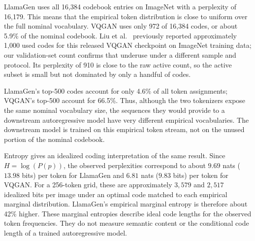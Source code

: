 \begin{table}[t]
    \centering
    \small
    \setlength{\tabcolsep}{4pt}
    \caption{ImageNet codebook usage summary. Active counts report how many nominal codes appear on ImageNet; effective active counts use the threshold of at least 13 assignments. Top-$m$ values report the fraction of all token assignments covered by the most frequent $m$ codes.}
    \label{tab:rq1_codebook_usage}
\end{table}

LlamaGen uses all 16,384 codebook entries on ImageNet with a perplexity of 16,179. This means that the empirical token distribution is close to uniform over the full nominal vocabulary. VQGAN uses only 972 of 16,384 codes, or about 5.9\% of the nominal codebook. Liu et al.~\cite{liu2024elucidating} previously reported approximately 1{,}000 used codes for this released VQGAN checkpoint on ImageNet training data; our validation-set count confirms that underuse under a different sample and protocol. Its perplexity of 910 is close to the raw active count, so the active subset is small but not dominated by only a handful of codes.

LlamaGen's top-500 codes account for only 4.6\% of all token assignments; VQGAN's top-500 account for 66.5\%. Thus, although the two tokenizers expose the same nominal vocabulary size, the sequences they would provide to a downstream autoregressive model have very different empirical vocabularies. The downstream model is trained on this empirical token stream, not on the unused portion of the nominal codebook.

Entropy gives an idealized coding interpretation of the same result. Since
$H=\log(P(p))$, the observed perplexities correspond to about
$9.69$ nats ($13.98$ bits) per token for LlamaGen and $6.81$ nats ($9.83$
bits) per token for VQGAN. For a 256-token grid, these are approximately
$3{,}579$ and $2{,}517$ idealized bits per image under an optimal code matched
to each empirical marginal distribution. LlamaGen's empirical marginal
entropy is therefore about 42\% higher. These marginal entropies describe ideal
code lengths for the observed token frequencies. They do not measure semantic
content or the conditional code length of a trained autoregressive model.

